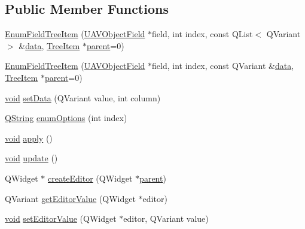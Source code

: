 \subsection*{\-Public \-Member \-Functions}
\begin{DoxyCompactItemize}
\item 
\hyperlink{group___u_a_v_object_browser_plugin_ga5f84bbb8e18a37ce79f64461e789f788}{\-Enum\-Field\-Tree\-Item} (\hyperlink{class_u_a_v_object_field}{\-U\-A\-V\-Object\-Field} $\ast$field, int index, const \-Q\-List$<$ \-Q\-Variant $>$ \&\hyperlink{group___u_a_v_object_browser_plugin_ga7c5708ae3cbba9c509f497c493beccb6}{data}, \hyperlink{class_tree_item}{\-Tree\-Item} $\ast$\hyperlink{group___u_a_v_object_browser_plugin_gaa3a7ba624312b6be70872634db291881}{parent}=0)
\item 
\hyperlink{group___u_a_v_object_browser_plugin_ga15760edd8f3a9a12602e371c80ce41d7}{\-Enum\-Field\-Tree\-Item} (\hyperlink{class_u_a_v_object_field}{\-U\-A\-V\-Object\-Field} $\ast$field, int index, const \-Q\-Variant \&\hyperlink{group___u_a_v_object_browser_plugin_ga7c5708ae3cbba9c509f497c493beccb6}{data}, \hyperlink{class_tree_item}{\-Tree\-Item} $\ast$\hyperlink{group___u_a_v_object_browser_plugin_gaa3a7ba624312b6be70872634db291881}{parent}=0)
\item 
\hyperlink{group___u_a_v_objects_plugin_ga444cf2ff3f0ecbe028adce838d373f5c}{void} \hyperlink{group___u_a_v_object_browser_plugin_ga9b505163cede21ebe793e4f55f238591}{set\-Data} (\-Q\-Variant value, int column)
\item 
\hyperlink{group___u_a_v_objects_plugin_gab9d252f49c333c94a72f97ce3105a32d}{\-Q\-String} \hyperlink{group___u_a_v_object_browser_plugin_ga8e27834043bde7967a644fdb2b6157f8}{enum\-Options} (int index)
\item 
\hyperlink{group___u_a_v_objects_plugin_ga444cf2ff3f0ecbe028adce838d373f5c}{void} \hyperlink{group___u_a_v_object_browser_plugin_ga28f3c98e391b2dc64c680f5f051b1c10}{apply} ()
\item 
\hyperlink{group___u_a_v_objects_plugin_ga444cf2ff3f0ecbe028adce838d373f5c}{void} \hyperlink{group___u_a_v_object_browser_plugin_ga3eb923fde33bef4803a779dd493e2947}{update} ()
\item 
\-Q\-Widget $\ast$ \hyperlink{group___u_a_v_object_browser_plugin_ga44f6457ccf2e1741aef853d851162981}{create\-Editor} (\-Q\-Widget $\ast$\hyperlink{group___u_a_v_object_browser_plugin_gaa3a7ba624312b6be70872634db291881}{parent})
\item 
\-Q\-Variant \hyperlink{group___u_a_v_object_browser_plugin_ga90464609dbac318a21de05cc0b906c6d}{get\-Editor\-Value} (\-Q\-Widget $\ast$editor)
\item 
\hyperlink{group___u_a_v_objects_plugin_ga444cf2ff3f0ecbe028adce838d373f5c}{void} \hyperlink{group___u_a_v_object_browser_plugin_gaf34de2505125e49c75e2f4623cdaa726}{set\-Editor\-Value} (\-Q\-Widget $\ast$editor, \-Q\-Variant value)
\end{DoxyCompactItemize}


